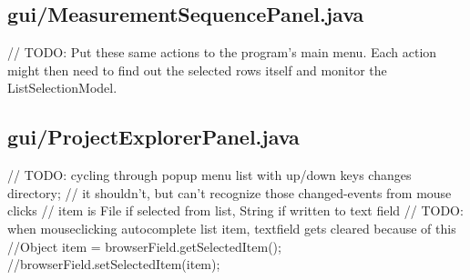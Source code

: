 \subsection{gui/MeasurementSequencePanel.java}
        // TODO: Put these same actions to the program's main menu. Each action might then need to find out the selected rows itself and monitor the ListSelectionModel.

\subsection{gui/ProjectExplorerPanel.java}
                // TODO: cycling through popup menu list with up/down keys changes directory;
                // it shouldn't, but can't recognize those changed-events from mouse clicks
                // item is File if selected from list, String if written to text field
                    // TODO: when mouseclicking autocomplete list item, textfield gets cleared because of this
                    //Object item = browserField.getSelectedItem();
                    //browserField.setSelectedItem(item);

